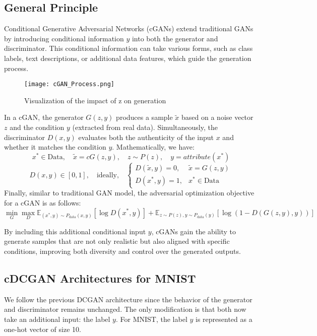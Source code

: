 \documentclass{rapportECL}
\begin{document}
\subsection{General Principle}
Conditional Generative Adversarial Networks (cGANs) extend traditional GANs by introducing conditional information \( y \) into both the generator and discriminator. This conditional information can take various forms, such as class labels, text descriptions, or additional data features, which guide the generation process.

    \begin{figure}[H]
    \centering
    \texttt{[image: cGAN\_Process.png]}
    \caption{Visualization of the impact of z on generation}
    \end{figure}


In a cGAN, the generator \( G(z, y) \) produces a sample \( \tilde{x} \) based on a noise vector \( z \) and the condition \( y \) (extracted from real data). Simultaneously, the discriminator \( D(x, y) \) evaluates both the authenticity of the input \( x \) and whether it matches the condition \( y \). Mathematically, we have:
\[
x^* \in \text{Data},\quad \tilde{x} = cG(z, y), \quad z \sim P(z), \quad y = attribute(x^*)
\]
\[
D(x, y) \in [0, 1], \quad \text{ideally,} \quad
\begin{cases} 
D(\tilde{x}, y) = 0, & \tilde{x} = G(z, y) \\
D(x^*, y) = 1, & x^* \in \text{Data}
\end{cases}
\]
Finally, similar to traditional GAN model, the adversarial optimization objective for a cGAN is as follows:
\begin{equation}
\min_G \max_D \mathbb{E}_{(x^*, y) \sim P_{\text{data}}(x, y)}[\log D(x^*, y)] 
+ \mathbb{E}_{z \sim P(z), y \sim P_{\text{data}}(y)}[\log(1 - D(G(z, y), y))]
\end{equation}

By including this additional conditional input $y$, cGANs gain the ability to generate samples that are not only realistic but also aligned with specific conditions, improving both diversity and control over the generated outputs.

\subsection{cDCGAN Architectures for MNIST}
We follow the previous DCGAN architecture since the behavior of the generator and discriminator remains unchanged. The only modification is that both now take an additional input: the label $y$. For MNIST, the label $y$ is represented as a one-hot vector of size 10. 
\end{document}
